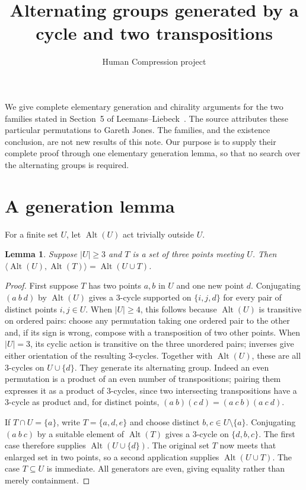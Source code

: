 \documentclass[11pt,a4paper]{article}
\title{Alternating groups generated by a cycle and two transpositions}
\author{Human Compression project}\date{}
\newtheorem{lemma}{Lemma}
\newcommand{\Alt}{\operatorname{Alt}}
\begin{document}
\maketitle
We give complete elementary generation and chirality arguments for the
two families stated in Section~5 of Leemans--Liebeck~\cite{LL}. The source
attributes these particular permutations to Gareth Jones. The families,
and the existence conclusion, are not new results of this note. Our purpose
is to supply their complete proof through one elementary generation lemma,
so that no search over the alternating groups is required.

\section{A generation lemma}
For a finite set $U$, let $\Alt(U)$ act trivially outside $U$.
\begin{lemma}\label{merge}
Suppose $|U|\geq3$ and $T$ is a set of three points meeting $U$.
Then $\langle\Alt(U),\Alt(T)\rangle=\Alt(U\cup T)$.
\end{lemma}
\begin{proof}
First suppose $T$ has two points $a,b$ in $U$ and one new point $d$.
Conjugating $(a\ b\ d)$ by $\Alt(U)$ gives a $3$-cycle supported on
$\{i,j,d\}$ for every pair of distinct points $i,j\in U$.
When $|U|\geq4$, this follows because $\Alt(U)$ is transitive on ordered
pairs: choose any permutation taking one ordered pair to the other and,
if its sign is wrong, compose with a transposition of two other points.
When $|U|=3$, its cyclic action is transitive on the three unordered pairs;
inverses give either orientation of the resulting $3$-cycles.
Together with $\Alt(U)$, these are all $3$-cycles on $U\cup\{d\}$.
They generate its alternating group. Indeed an even permutation is a product
of an even number of transpositions; pairing them expresses it as a product
of $3$-cycles, since two intersecting transpositions have a $3$-cycle as
product and, for distinct points, $(a\ b)(c\ d)=(a\ c\ b)(a\ c\ d)$.

If $T\cap U=\{a\}$, write $T=\{a,d,e\}$ and choose distinct
$b,c\in U\setminus\{a\}$. Conjugating $(a\ b\ c)$ by a suitable
element of $\Alt(T)$ gives a $3$-cycle on $\{d,b,c\}$.
The first case therefore supplies $\Alt(U\cup\{d\})$.
The original set $T$ now meets that enlarged set in two points, so a
second application supplies $\Alt(U\cup T)$. The case $T\subseteq U$
is immediate. All generators are even, giving equality rather than merely
containment.
\end{proof}
\end{document}
